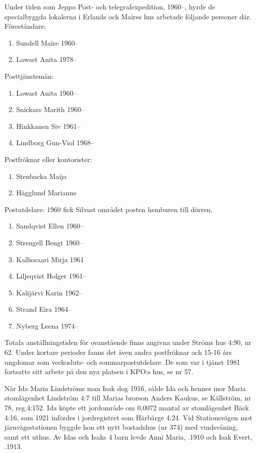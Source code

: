 Under tiden som Jeppo Post- och telegrafexpedition, 1960--, hyrde de specialbyggda lokalerna i Erlands och Maires hus arbetade följande personer där.
Föreståndare:
\begin{enumerate}
  \item Sundell Maire	1960--
  \item Lawast Anita	1978--
\end{enumerate}

Posttjänstemän:
\begin{enumerate}
  \item Lawast Anita      1960--
  \item Snickars Marith	  1960--
  \item Hinkkanen Siv     1961--
  \item Lindborg Gun-Viol	1968--
\end{enumerate}

Postfröknar eller kontorister:
\begin{enumerate}
  \item Stenbacka Maija
  \item Hägglund Marianne
\end{enumerate}

Postutdelare: 1960 fick Silvast området posten hemburen  till dörren.
\begin{enumerate}
  \item Sandqvist Ellen     1960--
  \item Strengell Bengt     1960--
  \item Kalliosaari Mirja	  1961
  \item Liljeqvist Holger	  1961--
  \item Kalijärvi Karin	    1962--
  \item Strand Eira	        1964--
  \item Nyberg Leena        1974--
\end{enumerate}
Totala anställningstiden för ovanstående finns angivna under Ströms hus 4:90, nr 62. Under kortare perioder fanns det även andra postfröknar och 15-16 års ungdomar som veckosluts- och sommarpostutdelare. De som var i tjänst 1981 fortsatte sitt arbete på den nya platsen i KPO:s hus, se nr 57.


När Ida Maria Lindströms man Isak dog 1916, sålde Ida och hennes mor Maria stomlägenhet Lindström 4:7 till Marias brorson Anders Kaukus, se Källström, nr 78, reg.4:152. Ida köpte ett jordområde om 0,0072 mantal av stomlägenhet Bäck 4:16, som 1921 infördes i jordregistret som Härbärge 4:24. Vid Stationsvägen mot järnvägsstationen byggde hon ett nytt bostadshus (nr 374) med vindsvåning, samt ett uthus. Av Idas och Isaks 4 barn levde Anni Maria, .1910 och Isak Evert, .1913.


